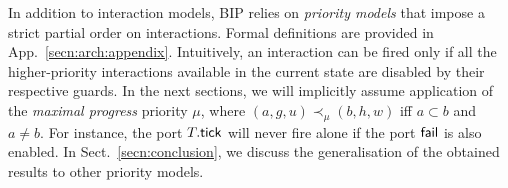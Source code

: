 \documentclass{llncs}
\newcommand{\Simon}{\\\hfill\mdash Simon}
\newcommand{\noteSB}[2][color=green!40, size=\tiny]{\todo[#1]{{#2}\Simon}}
\newcommand{\todoSB}[2][color=green!40, size=\tiny]{\todo[#1]{\textbf{To-do Simon:} {#2}}}
\newcommand{\todoSBin}[2][inline,color=green!40]{\todo[#1]{\textbf{To-do Simon: } {#2}}}
\newcommand{\fig}[1]{Fig.~\ref{fig:#1}}
\newcommand{\secn}[1]{Sect.~\ref{secn:#1}}
\newcommand{\app}[1]{App.~\ref{secn:#1}}
\newcommand{\mdash}[1][]{---#1}
\newcommand{\goesto}[2][]{\ensuremath{\xrightarrow[{#1}\relax]{#2}}}
\newcommand{\twosynch}{%
  \mbox{\ensuremath{\bullet\!\!\!-\!\!\!-\!\!\!-\!\!\!\bullet}}}
\begin{document}



In addition to interaction models, BIP relies on 
  \emph{priority models} that impose  a strict partial order on
  interactions.  Formal definitions are provided in \app{arch:appendix}.  Intuitively, an interaction can be fired only if all
  the higher-priority interactions available in the current state are
  disabled by their respective guards.
%
In the next sections, we will implicitly assume application of the  \emph{maximal
  progress} priority $\mu$, where $(a, g, u) \prec_\mu (b, h, w)$ iff  $a \subset b$ and $a \neq b$.  For instance, the
port $T.\mathsf{tick}$ will never fire alone if the port $\mathsf{fail}$ is also enabled.
In \secn{conclusion}, we discuss the generalisation of the
obtained results to other priority models.



\end{document}
